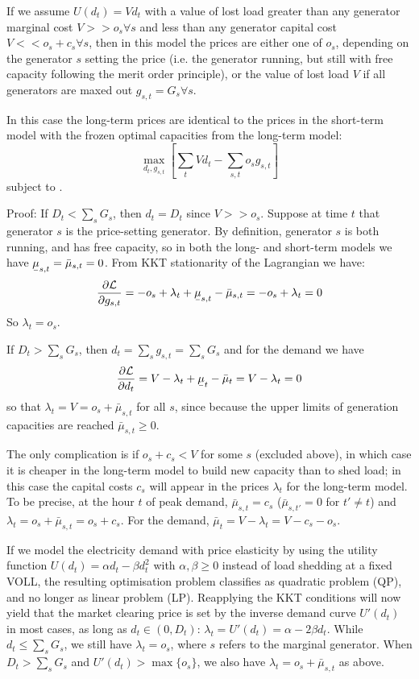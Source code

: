 \documentclass[final,3p]{elsarticle}
\def\l{\lambda} \def\K{\kappa} \def\m{\mu} \def\G{\Gamma} \def\d{\partial}
\def\cL{\mathcal{L}} \newcommand{\ubar}[1]{\text{\b{$#1$}}}
\begin{document}
If we assume $U(d_t)=Vd_t$ with a value of lost load greater than any generator
marginal cost $V >> o_s \forall s$ and less than any generator capital cost $V
<< o_s + c_s \forall s$, then in this model the prices are either one of $o_s$,
depending on the generator $s$ setting the price (i.e. the generator running,
but still with free capacity following the merit order principle), or the value
of lost load $V$ if all generators are maxed out $g_{s,t} = G_s \forall s$.

In this case the long-term prices are identical to the prices in the short-term
model with the frozen optimal capacities from the long-term model:
\begin{equation}
  \max_{d_{t}, g_{s,t}}\left[\sum_{t} V d_{t}  - \sum_{s,t} o_{s} g_{s,t} \right]  \label{eq:objs}
\end{equation}
subject to .

Proof: If $D_t < \sum_s G_{s}$, then $d_t = D_t$ since $V >> o_s$. Suppose at
time $t$ that generator $s$ is the price-setting generator. By definition,
generator $s$ is both running, and has free capacity, so in both the long- and
short-term models we have $\ubar{\mu}_{s,t} = \bar{\mu}_{s,t} = 0$.
From KKT stationarity of the Lagrangian we have:
\begin{align}
  \frac{\d \cL}{\d g_{s,t}} =  -o_s + \l_t + \ubar{\mu}_{s,t} - \bar{\mu}_{s,t}  =  -o_s + \l_t = 0
\end{align}
So $\l_t = o_s$.

If $D_t > \sum_s G_{s}$, then $d_t = \sum_s g_{s,t} = \sum_s G_{s}$ and for the
demand we have
\begin{align}
  \frac{\d \cL}{\d d_{t}} =  V -\l_t + \ubar{\mu}_{t} - \bar{\mu}_{t}  =  V - \l_t = 0
\end{align}
so that $\l_t = V = o_s + \bar{\mu}_{s,t}$ for all $s$, since because the upper
limits of generation capacities are reached $\bar{\mu}_{s,t} \geq 0$.

The only complication is if $o_s + c_s < V$ for some $s$ (excluded above), in
which case it is cheaper in the long-term model to build new capacity than to
shed load; in this case the capital costs $c_s$ will appear in the prices $\l_t$
for the long-term model. To be precise, at the hour $t$ of peak demand,
$\bar{\mu}_{s,t} = c_s$ ($\bar{\mu}_{s,t'} =0$ for $t' \neq t$) and $\l_t = o_s
+ \bar{\mu}_{s,t} = o_s + c_s$. For the demand, $\bar{\mu}_{t} = V - \l_t = V -
c_s - o_s$.

If we model the electricity demand with price elasticity by using the utility
function $U(d_t) = \alpha d_t - \beta d_t^2$ with $\alpha,\beta\geq 0$ instead
of load shedding at a fixed VOLL, the resulting optimisation problem classifies
as quadratic problem (QP), and no longer as linear problem (LP). Reapplying the
KKT conditions will now yield that the market clearing price is set by the
inverse demand curve $U'(d_t)$ in most cases, as long as $d_t \in (0, D_t)$:
$\l_t = U'(d_t) = \alpha - 2 \beta d_t$. While $d_t \leq \sum_s G_s$, we still
have $\l_t = o_s$, where $s$ refers to the marginal generator. When $D_t >
\sum_s G_s$ and $U'(d_t) > \max\{o_s\}$, we also have $\l_t = o_s +
\bar{\mu}_{s,t}$ as above.
\end{document}
